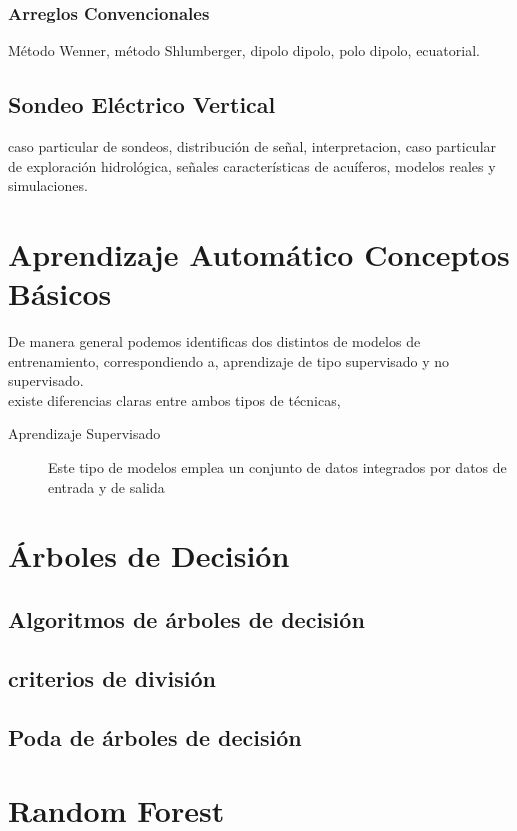 			\subsubsection{Arreglos Convencionales}
				Método Wenner, método Shlumberger, dipolo dipolo, polo dipolo, ecuatorial.\\
				
		\subsection{Sondeo Eléctrico Vertical}
		caso particular de sondeos, distribución de señal, interpretacion, caso particular de exploración hidrológica, señales características de acuíferos, modelos reales y simulaciones.\\
	\section{Aprendizaje Automático Conceptos Básicos}
		De manera general podemos identificas dos distintos de modelos de entrenamiento, correspondiendo a, aprendizaje de tipo supervisado y no supervisado.\\
		
		existe diferencias claras entre ambos tipos de técnicas,
		
		\begin{description}
			\item[Aprendizaje Supervisado] Este tipo de modelos emplea un conjunto de datos integrados por datos de entrada y de salida
		\end{description}
		
		 
	\section{Árboles de Decisión}
		\subsection{Algoritmos de árboles de decisión}
		\subsection{criterios de división}
		\subsection{Poda de árboles de decisión}
	\section{Random Forest}
